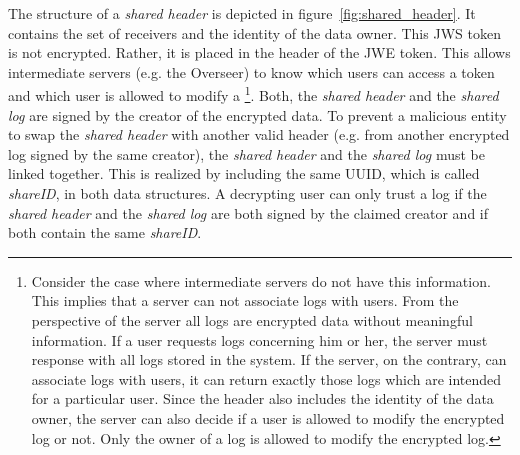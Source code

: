 \documentclass[../main.tex]{subfiles}
\begin{document}
The structure of a \textit{shared header} is depicted in figure~\ref{fig:shared_header}.
It contains the set of receivers and the identity of the data owner.
This JWS token is not encrypted.
Rather, it is placed in the header of the JWE token.
This allows intermediate servers (e.g. the Overseer) to know which users can access a token and which user is allowed to modify a
\footnote{
    Consider the case where intermediate servers do not have this information.
    This implies that a server can not associate logs with users.
    From the perspective of the server all logs are encrypted data without meaningful information.
    If a user requests logs concerning him or her, the server must response with all logs stored in the system. 
    If the server, on the contrary, can associate logs with users, it can return exactly those logs which are intended for a particular user. 
    Since the header also includes the identity of the data owner, the server can also decide if a user is allowed to modify the encrypted log or not.
    Only the owner of a log is allowed to modify the encrypted log.
}.
Both, the \textit{shared header} and the \textit{shared log} are signed by the creator of the encrypted data.
To prevent a malicious entity to swap the \textit{shared header} with another valid header (e.g. from another encrypted log signed by the same creator), the \textit{shared header} and the \textit{shared log} must be linked together.
This is realized by including the same UUID, which is called \textit{shareID}, in both data structures.
A decrypting user can only trust a log if the \textit{shared header} and the \textit{shared log} are both signed by the claimed creator and if both contain the same \textit{shareID}.
\end{document}
